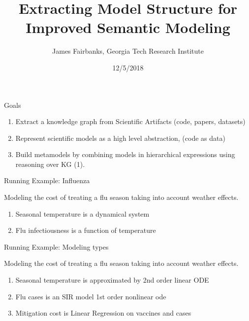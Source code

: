 \documentclass[ignorenonframetext,]{beamer}
\title{Extracting Model Structure for Improved Semantic Modeling}
\date{12/5/2018}
\author{James Fairbanks, Georgia Tech Research Institute}
\providecommand{\tightlist}{%
  \setlength{\itemsep}{0pt}\setlength{\parskip}{0pt}}
\begin{document}
\begin{frame}
\maketitle{}
\end{frame}

\begin{frame}{Goals}
\protect\hypertarget{goals}{}

\begin{enumerate}
\tightlist
\item
  Extract a knowledge graph from Scientific Artifacts (code, papers,
  datasets)
\item
  Represent scientific models as a high level abstraction, (code as data)
\item
  Build metamodels by combining models in hierarchical expressions using
  reasoning over KG (1).
\end{enumerate}

\end{frame}

\begin{frame}{Running Example: Influenza}
\protect\hypertarget{running-example-influenza}{}

Modeling the cost of treating a flu season taking into account weather
effects.

\begin{enumerate}
\tightlist
\item
  Seasonal temperature is a dynamical system
\item
  Flu infectiousness is a function of temperature
\end{enumerate}

\end{frame}

\begin{frame}{Running Example: Modeling types}
\protect\hypertarget{running-example-modeling-types}{}

Modeling the cost of treating a flu season taking into account weather
effects.

\begin{enumerate}
\tightlist
\item
  Seasonal temperature is approximated by 2nd order linear ODE
\item
  Flu cases is an SIR model 1st order nonlinear ode
\item
  Mitigation cost is Linear Regression on vaccines and cases
\end{enumerate}

\end{frame}
\end{document}
